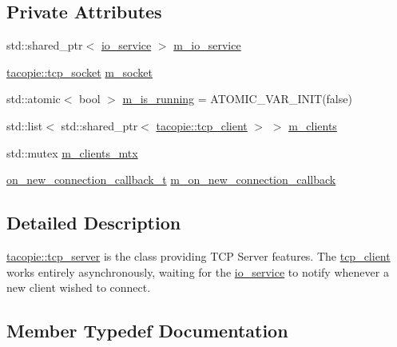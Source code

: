 \subsection*{Private Attributes}
\begin{DoxyCompactItemize}
\item 
std\+::shared\+\_\+ptr$<$ \hyperlink{classtacopie_1_1io__service}{io\+\_\+service} $>$ \hyperlink{classtacopie_1_1tcp__server_a91d9aa88e0de045dc0bb54cddf02e786}{m\+\_\+io\+\_\+service}
\item 
\hyperlink{classtacopie_1_1tcp__socket}{tacopie\+::tcp\+\_\+socket} \hyperlink{classtacopie_1_1tcp__server_a2838c1b655a8c4f5ccb1e157afc17284}{m\+\_\+socket}
\item 
std\+::atomic$<$ bool $>$ \hyperlink{classtacopie_1_1tcp__server_a7b7651a482cbc5bb19145b77fe322ced}{m\+\_\+is\+\_\+running} = A\+T\+O\+M\+I\+C\+\_\+\+V\+A\+R\+\_\+\+I\+N\+IT(false)
\item 
std\+::list$<$ std\+::shared\+\_\+ptr$<$ \hyperlink{classtacopie_1_1tcp__client}{tacopie\+::tcp\+\_\+client} $>$ $>$ \hyperlink{classtacopie_1_1tcp__server_ab3e475c59504150c4f3dc68bdb932670}{m\+\_\+clients}
\item 
std\+::mutex \hyperlink{classtacopie_1_1tcp__server_ad4ee31fe6e01a38bb2a3b11a0f29ab9a}{m\+\_\+clients\+\_\+mtx}
\item 
\hyperlink{classtacopie_1_1tcp__server_a103cb4e6fcab00f88a708aabd38b66ff}{on\+\_\+new\+\_\+connection\+\_\+callback\+\_\+t} \hyperlink{classtacopie_1_1tcp__server_a779d20d286c32e5daff0012548afdfd0}{m\+\_\+on\+\_\+new\+\_\+connection\+\_\+callback}
\end{DoxyCompactItemize}


\subsection{Detailed Description}
\hyperlink{classtacopie_1_1tcp__server}{tacopie\+::tcp\+\_\+server} is the class providing T\+CP Server features. The \hyperlink{classtacopie_1_1tcp__client}{tcp\+\_\+client} works entirely asynchronously, waiting for the \hyperlink{classtacopie_1_1io__service}{io\+\_\+service} to notify whenever a new client wished to connect. 

\subsection{Member Typedef Documentation}
\mbox{\label{classtacopie_1_1tcp__server_a103cb4e6fcab00f88a708aabd38b66ff}} 
